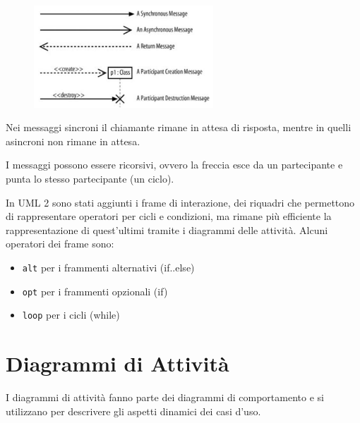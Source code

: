 \begin{figure}[H]
\centering
    \includegraphics[width=0.6\textwidth]{res/img/messaggiDiagrammiSequenza}
\end{figure}

Nei messaggi sincroni il chiamante rimane in attesa di risposta, mentre in quelli asincroni non rimane in attesa.

I messaggi possono essere ricorsivi, ovvero la freccia esce da un partecipante e punta lo stesso partecipante (un ciclo).

In UML 2 sono stati aggiunti i frame di interazione, dei riquadri che permettono di rappresentare operatori per cicli e condizioni, ma rimane più efficiente la rappresentazione di quest'ultimi tramite i diagrammi delle attività. 
Alcuni operatori dei frame sono:
\begin{itemize}
\item \texttt{alt} per i frammenti alternativi (if..else)
\item \texttt{opt} per i frammenti opzionali (if)
\item \texttt{loop} per i cicli (while)
\end{itemize}

\section{Diagrammi di Attività}
I diagrammi di attività fanno parte dei diagrammi di comportamento e si utilizzano per descrivere gli aspetti dinamici dei casi d'uso.

